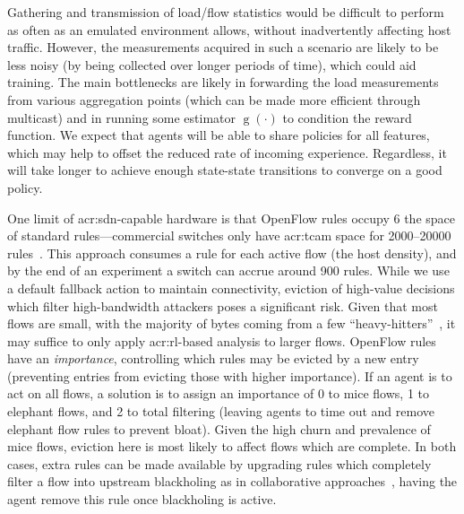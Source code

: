 Gathering and transmission of load/flow statistics would be difficult to perform as often as an emulated environment allows, without inadvertently affecting host traffic.
However, the measurements acquired in such a scenario are likely to be less noisy (by being collected over longer periods of time), which could aid training.
The main bottlenecks are likely in forwarding the load measurements from various aggregation points (which can be made more efficient through multicast) and in running some estimator $\operatorname{g}(\cdot)$ to condition the reward function.
We expect that agents will be able to share policies for all features, which may help to offset the reduced rate of incoming experience.
Regardless, it will take longer to achieve enough state-state transitions to converge on a good policy.

One limit of \gls{acr:sdn}-capable hardware is that OpenFlow rules occupy \qty{6}{\times} the space of standard rules---commercial switches only have \gls{acr:tcam} space for \numrange{2000}{20000} rules~\parencite{DBLP:journals/comsur/NguyenSBT16}.
This approach consumes a rule for each active flow (the host density), and by the end of an experiment a switch can accrue around \num{900} rules.
While we use a default fallback action to maintain connectivity, eviction of high-value decisions which filter high-bandwidth attackers poses a significant risk.
Given that most flows are small, with the majority of bytes coming from a few ``heavy-hitters''~\parencite{DBLP:journals/ccr/PanBPS03}, it may suffice to only apply \gls{acr:rl}-based analysis to larger flows.
OpenFlow rules have an \emph{importance}, controlling which rules may be evicted by a new entry (preventing entries from evicting those with higher importance).
If an agent is to act on all flows, a solution is to assign an importance of 0 to mice flows, 1 to elephant flows, and 2 to total filtering (leaving agents to time out and remove elephant flow rules to prevent bloat).
Given the high churn and prevalence of mice flows, eviction here is most likely to affect flows which are complete.
In both cases, extra rules can be made available by upgrading rules which completely filter a flow into upstream blackholing as in collaborative approaches~\parencite{DBLP:conf/acsac/RamanathanMYZ18}, having the agent remove this rule once blackholing is active.